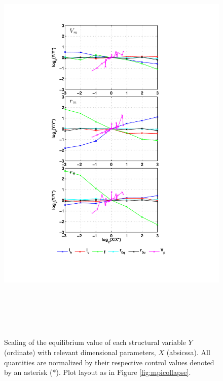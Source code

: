 \documentclass[12pt]{article}
\begin{document}
\begin{figure}[h!]
\centering
  \noindent\includegraphics[width=15cm,height=20cm]{FIGURES/Dimensional_scaling.pdf}
\caption{Scaling of the equilibrium value of each structural variable $Y$ (ordinate) with relevant dimensional parameters, $X$ (absicssa). All quantities are normalized by their respective control values denoted by an asterisk ($*$). Plot layout as in Figure \ref{fig:mpicollapse}.}
\label{fig:dimscaling}
\end{figure}
\end{document}
